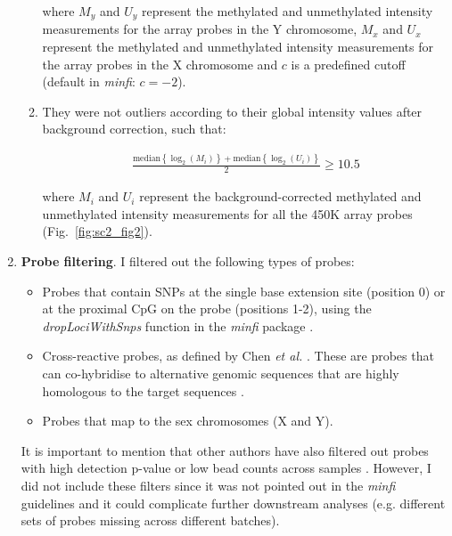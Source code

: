 \begin{enumerate}
\begin{enumerate}
			where $M_{y}$ and $U_{y}$ represent the methylated and unmethylated intensity measurements for the array probes in the Y chromosome, $M_{x}$ and $U_{x}$ represent the methylated and unmethylated intensity measurements for the array probes in the X chromosome and $c$ is a predefined cutoff (default in \textit{minfi}: $c=-2$).
			
			\smallskip
			
			\item They were not outliers according to their global intensity values after background correction, such that:
			
			\begin{align}
			\frac{\mathrm{median}\left\{\log_2(M_{i})\right\} + \mathrm{median}\left\{\log_2(U_{i})\right\}}{2} \geq 10.5
			\end{align}
			
			where $M_{i}$ and $U_{i}$ represent the background-corrected methylated and unmethylated intensity measurements for all the 450K array probes (Fig.~\ref{fig:sc2_fig2}).
			
		\end{enumerate} 
	
	\item \textbf{Probe filtering}. I filtered out the following types of probes:
	
	\begin{itemize}
		
		\item Probes that contain \acrshort{SNP}s at the single base extension site (position 0) or at the proximal CpG on the probe (positions 1-2), using the \textit{dropLociWithSnps} function in the \textit{minfi} package \cite{Aryee2014}. 
		
		\item Cross-reactive probes, as defined by Chen \textit{et al.} \cite{Chen2013}. These are probes that can co-hybridise to alternative genomic sequences that are highly homologous to the target sequences \cite{Chen2013}.  
		
		\item  Probes that map to the sex chromosomes (X and Y).
	
	\end{itemize}
	
	It is important to mention that other authors have also filtered out probes with high detection p-value or low bead counts across samples \cite{Wilhelm-Benartzi2013,Morris2015}. However, I did not include these filters since it was not pointed out in the \textit{minfi} guidelines \cite{Aryee2014,Fortin2015} and it could complicate further downstream analyses (e.g. different sets of probes missing across different batches).     
	

\end{enumerate}
